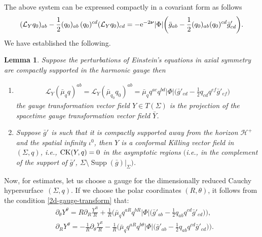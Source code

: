 \documentclass[pdftex]{sigma}
\def\ptl{\partial}%
\def\mbo#1{\boldsymbol{#1}}%
\def\halb{\frac{1}{2}}%
\numberwithin{equation}{section}
\newtheorem{Lemma}[Theorem]{Lemma}
\begin{document}
 The above system can be expressed compactly in a covariant form as follows
\begin{align*}
(\mathcal{L}_{Y} q_0)_{ab} - \halb (q_0)_{ab}\, (q_0)^{cd} (\mathcal{L}_{Y} q_0)_{cd}=-{\rm e}^{-2 \mbo{\nu}} \vert \Phi \vert \biggl(\bar{g}_{ab} - \halb (q_0)_{ab} (q_0)^{cd} \bar{g}'_{cd} \biggr).
\end{align*}
We have established the following.
\begin{Lemma} \label{Y-conformal-killing}
	Suppose the perturbations of Einstein's equations in axial symmetry are compactly supported in the harmonic gauge then
	\begin{enumerate}\itemsep=0pt
		\item[$(1)$] 	
		\begin{align} \label{2d-gauge-transform}
		\mathcal{L}_Y (\bar{\mu}_q q) ^{ab} = \mathcal{L}_Y (\bar{\mu}_{q_0} q_0) ^{ab}= \bar{\mu}_q q^{ac} q^{bd} \vert \Phi \vert \biggl(\bar{g}'_{cd} - \halb q_{cd} q^{ef} \bar{g}'_{ef}\biggr)
		\end{align}
		the gauge transformation vector field $Y \in T(\Sigma)$ is the projection of the spacetime gauge transformation vector field $\bar{Y}$.
	
	\item[$(2)$] Suppose $\bar{g}'$ is such that it is compactly supported away from the horizon $\mathcal{H^+}$ and the spatial infinity $\iota^0$, then $Y$	is a conformal Killing vector field in $(\Sigma, q)$, i.e., ${\rm CK}(Y, q) = 0$ in the asymptotic regions $($i.e., in the complement of the support of $\bar{g}'$, $\Sigma \setminus \operatorname{Supp}(\bar{g}) \vert_{\Sigma})$.
\end{enumerate}
\end{Lemma}

Now, for estimates, let us choose a gauge for the dimensionally reduced Cauchy hypersurface~$(\Sigma, q)$. If we choose the polar coordinates $(R, \theta)$, it follows from the condition \eqref{2d-gauge-transform} that:
\begin{subequations}\label{Y-theta-transport}
\begin{align}
&\ptl_ \theta Y^\theta= R \ptl_R \frac{Y^R}{R} + \frac{1}{R} \biggl(\bar{\mu}_q q^{aR} q^{bR} \vert \Phi \vert \biggl(\bar{g}'_{ab} - \halb q_{ab} q^{cd} \bar{g}'_{cd}\biggr) \biggr), \\
&\ptl_R Y^\theta= - \frac{1}{R} \ptl_\theta \frac{Y^R}{R} - \frac{1}{R} \biggl(\bar{\mu}_q q^{aR} q^{b\theta} \vert \Phi \vert \biggl(\bar{g}'_{ab} - \halb q_{ab} q^{cd} \bar{g}'_{cd}\biggr)\biggr).
\end{align}
\end{subequations}
\end{document}
